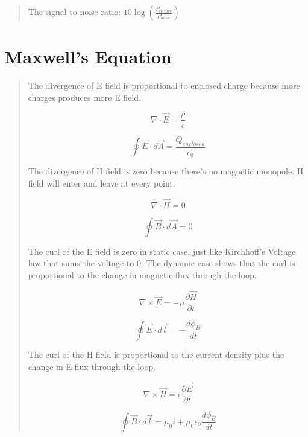 \documentclass{article} %
\begin{document}
\begin{quote}
    The signal to noise ratio: $10 \log\left(\frac{P_{\text{receive}}}{P_{\text{noise}}}\right)$
\end{quote}

\section{Maxwell's Equation}
\begin{quote}

    The divergence of E field is proportional to enclosed charge because more charges produces more E field.

    $$\nabla \cdot \vec{E} = \frac{\rho}{\epsilon}$$

    $$\oint \vec{E} \cdot d\vec{A} = \frac{Q_{enclosed}}{\epsilon_0}$$


    The divergence of H field is zero because there's no magnetic monopole. H field will enter and leave at every point.

    $$\nabla \cdot \vec{H} = 0$$

    $$\oint \vec{B} \cdot d\vec{A} = 0$$

    The curl of the E field is zero in static case, just like Kirchhoff's Voltage law that sums the voltage to 0. The dynamic case shows that the curl is proportional to the change in magnetic flux through the loop.

    $$\nabla \times \vec{E} = -\mu \frac{\partial \vec{H}}{\partial t}$$

    $$\oint \vec{E} \cdot d\vec{l} = -\frac{d\phi_B}{dt}$$

    The curl of the H field is proportional to the current density plus the change in E flux through the loop.

    $$\nabla \times \vec{H} = \epsilon \frac{\partial \vec{E}}{\partial t}$$

    $$\oint \vec{B} \cdot d\vec{l} = \mu_0 i + \mu_0 \epsilon_0 \frac{d \phi_E}{dt}$$
\end{quote}
\end{document}
